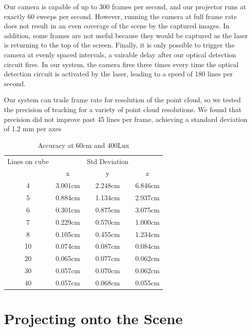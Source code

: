 \documentclass{llncs}
\begin{document}
Our camera is capable of up to 300 frames per second, and our projector runs at exactly 60 sweeps per second. However, running the camera at full frame rate does not result in an even coverage of the scene by the captured images. In addition, some frames are not useful because they would be captured as the laser is returning to the top of the screen. Finally, it is only possible to trigger the camera at evenly spaced intervals, a vairable delay after our optical detection circuit fires. In our system, the camera fires three times every time the optical detection circuit is activated by the laser, leading to a speed of 180 lines per second.

Our system can trade frame rate for resolution of the point cloud, so we tested the precision of tracking for a variety of point cloud resolutions. We found that precision did not improve past 45 lines per frame, achieving a standard deviation of 1.2 mm per axes
 

\begin{table}
\caption{Accuracy at 60cm and 400Lux }
\begin{tabular}{c|ccc}
\hline
\hline
Lines on cube & & Std Deviation & \\
 & x & y & z\\
\hline
4  & 3.001cm & 2.248cm & 6.846cm\\
5  & 0.884cm & 1.134cm & 2.937cm\\
6  & 0.301cm & 0.875cm & 3.075cm\\
7  & 0.229cm & 0.570cm & 1.000cm\\
8  & 0.105cm & 0.455cm & 1.234cm\\
10 & 0.074cm & 0.087cm & 0.084cm\\
20 & 0.065cm & 0.077cm & 0.062cm\\
30 & 0.057cm & 0.070cm & 0.062cm\\
40 & 0.057cm & 0.068cm & 0.055cm\\
\hline
\end{tabular}
\centering
\end{table}


\section{Projecting onto the Scene}
\end{document}

